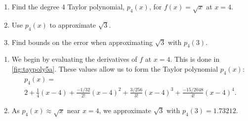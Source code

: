 \begin{example}\label{ex_taypoly5}
\begin{enumerate}
	\item	Find the degree 4 Taylor polynomial, $p_4(x)$, for $f(x)=\sqrt{x}$ at $x=4.$
	\item	Use $p_4(x)$ to approximate $\sqrt{3}$.
	\item	Find bounds on the error when approximating $\sqrt{3}$ with $p_4(3)$.
\end{enumerate}
\solution
\begin{enumerate}
	\item	We begin by evaluating the derivatives of $f$ at $x=4$. This is done in \autoref{fig:taypoly5a}. These values allow us to form the Taylor polynomial $p_4(x)$:
\begin{multline*}
p_4(x) = \\
2 + \frac14(x-4) +\frac{-1/32}{2!}(x-4)^2+\frac{3/256}{3!}(x-4)^3+\frac{-15/2048}{4!}(x-4)^4.
\end{multline*}

	\item	As $p_4(x) \approx \sqrt{x}$ near $x=4$, we approximate $\sqrt{3}$ with $p_4(3) = 1.73212$.


\end{enumerate}
\end{example}
